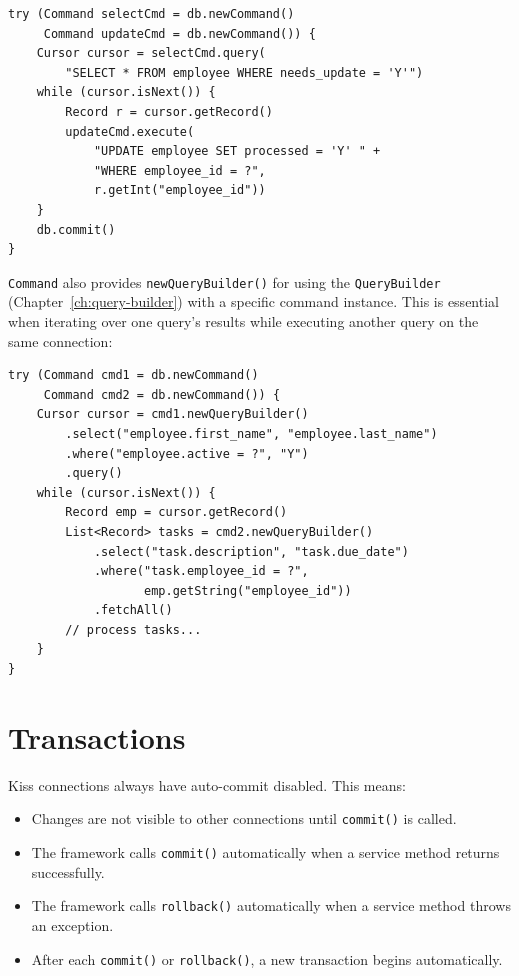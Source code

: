 \begin{lstlisting}[style=groovy]
try (Command selectCmd = db.newCommand()
     Command updateCmd = db.newCommand()) {
    Cursor cursor = selectCmd.query(
        "SELECT * FROM employee WHERE needs_update = 'Y'")
    while (cursor.isNext()) {
        Record r = cursor.getRecord()
        updateCmd.execute(
            "UPDATE employee SET processed = 'Y' " +
            "WHERE employee_id = ?",
            r.getInt("employee_id"))
    }
    db.commit()
}
\end{lstlisting}

\noindent
\texttt{Command} also provides \texttt{newQueryBuilder()} for using the \texttt{QueryBuilder} (Chapter~\ref{ch:query-builder}) with a specific command instance.  This is essential when iterating over one query's results while executing another query on the same connection:

\begin{lstlisting}[style=groovy]
try (Command cmd1 = db.newCommand()
     Command cmd2 = db.newCommand()) {
    Cursor cursor = cmd1.newQueryBuilder()
        .select("employee.first_name", "employee.last_name")
        .where("employee.active = ?", "Y")
        .query()
    while (cursor.isNext()) {
        Record emp = cursor.getRecord()
        List<Record> tasks = cmd2.newQueryBuilder()
            .select("task.description", "task.due_date")
            .where("task.employee_id = ?",
                   emp.getString("employee_id"))
            .fetchAll()
        // process tasks...
    }
}
\end{lstlisting}

\section{Transactions}
\label{sec:db-transactions}

Kiss connections always have auto-commit disabled.  This means:

\begin{itemize}
  \item Changes are not visible to other connections until \texttt{commit()} is called.
  \item The framework calls \texttt{commit()} automatically when a service method returns successfully.
  \item The framework calls \texttt{rollback()} automatically when a service method throws an exception.
  \item After each \texttt{commit()} or \texttt{rollback()}, a new transaction begins automatically.
\end{itemize}

